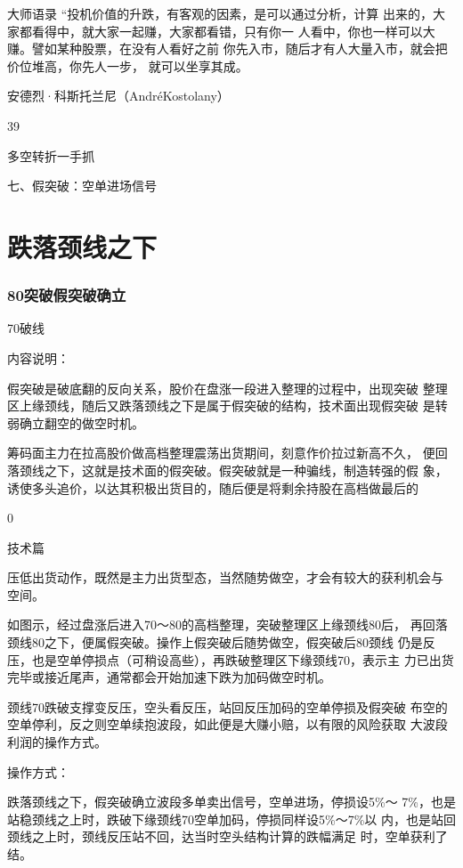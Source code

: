 \documentclass{article}
\begin{document}
大师语录 “投机价值的升跌，有客观的因素，是可以通过分析，计算 出来的，大家都看得中，就大家一起赚，大家都看错，只有你一 人看中，你也一样可以大赚。譬如某种股票，在没有人看好之前 你先入市，随后才有人大量入市，就会把价位堆高，你先人一步， 就可以坐享其成。

安德烈·科斯托兰尼（AndréKostolany）

39

\clearpage

多空转折一手抓

七、假突破：空单进场信号

\section{跌落颈线之下}

\subsubsection{80突破假突破确立}

70破线

内容说明：

假突破是破底翻的反向关系，股价在盘涨一段进入整理的过程中，出现突破 整理区上缘颈线，随后又跌落颈线之下是属于假突破的结构，技术面出现假突破 是转弱确立翻空的做空时机。

筹码面主力在拉高股价做高档整理震荡出货期间，刻意作价拉过新高不久， 便回落颈线之下，这就是技术面的假突破。假突破就是一种骗线，制造转强的假 象，诱使多头追价，以达其积极出货目的，随后便是将剩余持股在高档做最后的

0

\clearpage

技术篇

压低出货动作，既然是主力出货型态，当然随势做空，才会有较大的获利机会与 空间。

如图示，经过盘涨后进入70～80的高档整理，突破整理区上缘颈线80后， 再回落颈线80之下，便属假突破。操作上假突破后随势做空，假突破后80颈线 仍是反压，也是空单停损点（可稍设高些），再跌破整理区下缘颈线70，表示主 力已出货完毕或接近尾声，通常都会开始加速下跌为加码做空时机。

颈线70跌破支撑变反压，空头看反压，站回反压加码的空单停损及假突破 布空的空单停利，反之则空单续抱波段，如此便是大赚小赔，以有限的风险获取 大波段利润的操作方式。

操作方式：

跌落颈线之下，假突破确立波段多单卖出信号，空单进场，停损设5\%～ 7\%，也是站稳颈线之上时，跌破下缘颈线70空单加码，停损同样设5\%～7\%以 内，也是站回颈线之上时，颈线反压站不回，达当时空头结构计算的跌幅满足 时，空单获利了结。
\end{document}

